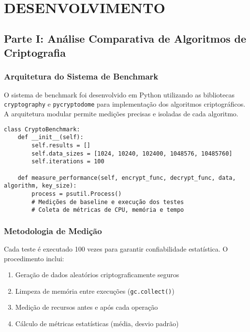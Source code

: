 \documentclass[12pt,a4paper,oneside]{article}
\begin{document}
\section{DESENVOLVIMENTO}

\subsection{Parte I: Análise Comparativa de Algoritmos de Criptografia}

\subsubsection{Arquitetura do Sistema de Benchmark}

O sistema de benchmark foi desenvolvido em Python utilizando as bibliotecas \texttt{cryptography} e \texttt{pycryptodome} para implementação dos algoritmos criptográficos. A arquitetura modular permite medições precisas e isoladas de cada algoritmo.

\begin{lstlisting}[caption=Estrutura principal da classe CryptoBenchmark]
class CryptoBenchmark:
    def __init__(self):
        self.results = []
        self.data_sizes = [1024, 10240, 102400, 1048576, 10485760]
        self.iterations = 100
    
    def measure_performance(self, encrypt_func, decrypt_func, data, algorithm, key_size):
        process = psutil.Process()
        # Medições de baseline e execução dos testes
        # Coleta de métricas de CPU, memória e tempo
\end{lstlisting}

\subsubsection{Metodologia de Medição}

Cada teste é executado 100 vezes para garantir confiabilidade estatística. O procedimento inclui:

\begin{enumerate}
    \item Geração de dados aleatórios criptograficamente seguros
    \item Limpeza de memória entre execuções (\texttt{gc.collect()})
    \item Medição de recursos antes e após cada operação
    \item Cálculo de métricas estatísticas (média, desvio padrão)
\end{enumerate}
\end{document}
